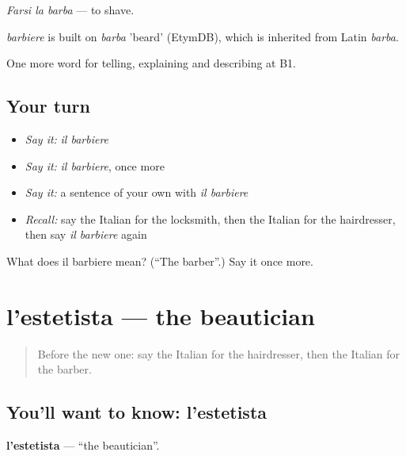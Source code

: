 \emph{Farsi la barba} — to shave.

\begin{cousinweb}
\emph{barbiere} is built on \emph{barba} 'beard' (EtymDB), which is inherited from Latin \emph{barba}.
\end{cousinweb}

\begin{grammarlens}[title={What you've built}]
One more word for telling, explaining and describing at B1.
\end{grammarlens}

\subsection*{Your turn}
\begin{itemize}
\raggedright
  \item \emph{Say it:} \emph{il barbiere}
  \item \emph{Say it:} \emph{il barbiere}, once more
  \item \emph{Say it:} a sentence of your own with \emph{il barbiere}
  \item \emph{Recall:} say the Italian for the locksmith, then the Italian for the hairdresser, then say \emph{il barbiere} again
\end{itemize}

\begin{tcolorbox}[breakable,colback=teal!4,colframe=teal!35!black,title={Before you move on}]
What does il barbiere mean? (\textquotedblleft{}The barber\textquotedblright{}.) Say it once more.
\end{tcolorbox}
\section[l'estetista]{l'estetista — the beautician}

\label{lesson:IT-C456-estetista}



\begin{quote}
Before the new one: say the Italian for the hairdresser, then the Italian for the barber.
\end{quote}

\subsection*{You'll want to know: l'estetista}
\textbf{l'estetista} — \textquotedblleft{}the beautician\textquotedblright{}.

